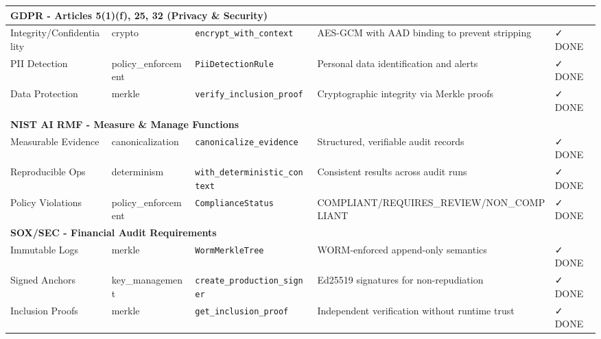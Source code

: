 \documentclass[11pt,a4paper]{article}
\begin{document}
\begin{longtable}{|p{2.5cm}|p{2cm}|p{1.8cm}|p{6cm}|p{1.5cm}|}
\multicolumn{5}{|l|}{\cellcolor{blue!20}\textbf{GDPR - Articles 5(1)(f), 25, 32 (Privacy \& Security)}} \\
\hline

Integrity/Confidentiality & crypto & \texttt{encrypt\_with\_context} & AES-GCM with AAD binding to prevent stripping & \cellcolor{green!30}✓ DONE \\
\hline

PII Detection & policy\_enforcement & \texttt{PiiDetectionRule} & Personal data identification and alerts & \cellcolor{green!30}✓ DONE \\
\hline

Data Protection & merkle & \texttt{verify\_inclusion\_proof} & Cryptographic integrity via Merkle proofs & \cellcolor{green!30}✓ DONE \\
\hline

\multicolumn{5}{|l|}{\cellcolor{blue!20}\textbf{NIST AI RMF - Measure \& Manage Functions}} \\
\hline

Measurable Evidence & canonicalization & \texttt{canonicalize\_evidence} & Structured, verifiable audit records & \cellcolor{green!30}✓ DONE \\
\hline

Reproducible Ops & determinism & \texttt{with\_deterministic\_context} & Consistent results across audit runs & \cellcolor{green!30}✓ DONE \\
\hline

Policy Violations & policy\_enforcement & \texttt{ComplianceStatus} & COMPLIANT/REQUIRES\_REVIEW/NON\_COMPLIANT & \cellcolor{green!30}✓ DONE \\
\hline

\multicolumn{5}{|l|}{\cellcolor{blue!20}\textbf{SOX/SEC - Financial Audit Requirements}} \\
\hline

Immutable Logs & merkle & \texttt{WormMerkleTree} & WORM-enforced append-only semantics & \cellcolor{green!30}✓ DONE \\
\hline

Signed Anchors & key\_management & \texttt{create\_production\_signer} & Ed25519 signatures for non-repudiation & \cellcolor{green!30}✓ DONE \\
\hline

Inclusion Proofs & merkle & \texttt{get\_inclusion\_proof} & Independent verification without runtime trust & \cellcolor{green!30}✓ DONE \\
\hline


\end{longtable}
\end{document}
